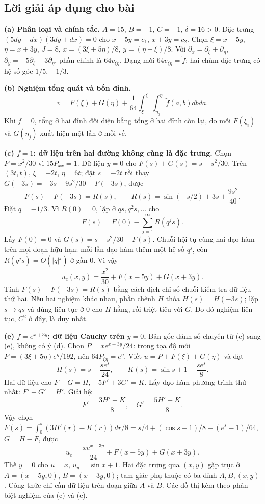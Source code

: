 \documentclass[10pt,a4paper]{article}
\begin{document}
\subsection*{Lời giải áp dụng cho bài}
\textbf{(a) Phân loại và chính tắc.} $A=15$, $B=-1$, $C=-1$, $\delta=16>0$. Đặc trưng $(5dy-dx)(3dy+dx)=0$ cho $x-5y=c_1$, $x+3y=c_2$. Chọn $\xi=x-5y$, $\eta=x+3y$, $J=8$, $x=(3\xi+5\eta)/8$, $y=(\eta-\xi)/8$. Với $\partial_x=\partial_\xi+\partial_\eta$, $\partial_y=-5\partial_\xi+3\partial_\eta$, phần chính là $64v_{\xi\eta}$. Dạng mới $64v_{\xi\eta}=\widetilde f$; hai chùm đặc trưng có hệ số góc $1/5$, $-1/3$.

\textbf{(b) Nghiệm tổng quát và bốn đỉnh.}
\[v=F(\xi)+G(\eta)+\frac1{64}\int_{\xi_0}^{\xi}\int_{\eta_0}^{\eta}\widetilde f(a,b)dbda.\]
Khi $f=0$, tổng ở hai đỉnh đối diện bằng tổng ở hai đỉnh còn lại, do mỗi $F(\xi_i)$ và $G(\eta_j)$ xuất hiện một lần ở mỗi vế.

\textbf{(c) $f=1$: dữ liệu trên hai đường không cùng là đặc trưng.} Chọn $P=x^2/30$ vì $15P_{xx}=1$. Dữ liệu $y=0$ cho $F(s)+G(s)=s-s^2/30$. Trên $(3t,t)$, $\xi=-2t$, $\eta=6t$; đặt $s=-2t$ rồi thay $G(-3s)=-3s-9s^2/30-F(-3s)$, được
\[F(s)-F(-3s)=R(s),\qquad R(s)=\sin(-s/2)+3s+\frac{9s^2}{40}.\]
Đặt $q=-1/3$. Vì $R(0)=0$, lặp ở $qs,q^2s,\ldots$ cho
\[F(s)=F(0)-\sum_{j=1}^{\infty}R(q^js).\]
Lấy $F(0)=0$ và $G(s)=s-s^2/30-F(s)$. Chuỗi hội tụ cùng hai đạo hàm trên mọi đoạn hữu hạn: mỗi lần đạo hàm thêm một hệ số $q^j$, còn $R(q^js)=O(|q|^j)$ ở gần $0$. Vì vậy
\[\boxed{u_c(x,y)=\frac{x^2}{30}+F(x-5y)+G(x+3y).}\]
Tính $F(s)-F(-3s)=R(s)$ bằng cách dịch chỉ số chuỗi kiểm tra dữ liệu thứ hai. Nếu hai nghiệm khác nhau, phần chênh $H$ thỏa $H(s)=H(-3s)$; lặp $s\mapsto qs$ và dùng liên tục ở $0$ cho $H$ hằng, rồi triệt tiêu với $G$. Do đó nghiệm liên tục, $C^2$ ở đây, là duy nhất.

\textbf{(e) $f=e^{x+3y}$: dữ liệu Cauchy trên $y=0$.} Bản gốc đánh số chuyển từ (c) sang (e), không có ý (d). Chọn $P=xe^{x+3y}/24$: trong tọa độ mới $P=(3\xi+5\eta)e^\eta/192$, nên $64P_{\xi\eta}=e^\eta$. Viết $u=P+F(\xi)+G(\eta)$ và đặt
\[H(s)=s-\frac{se^s}{24},\qquad K(s)=\sin s+1-\frac{se^s}{8}.\]
Hai dữ liệu cho $F+G=H$, $-5F'+3G'=K$. Lấy đạo hàm phương trình thứ nhất: $F'+G'=H'$. Giải hệ:
\[F'=\frac{3H'-K}{8},\quad G'=\frac{5H'+K}{8}.\]
Vậy chọn $F(s)=\int_0^s(3H'(r)-K(r))dr/8=s/4+(\cos s-1)/8-(e^s-1)/64$, $G=H-F$, được
\[\boxed{u_e=\frac{xe^{x+3y}}{24}+F(x-5y)+G(x+3y).}\]
Thế $y=0$ cho $u=x$, $u_y=\sin x+1$. Hai đặc trưng qua $(x,y)$ gặp trục ở $A=(x-5y,0)$, $B=(x+3y,0)$; tam giác phụ thuộc có ba đỉnh $A,B,(x,y)$. Công thức chỉ cần dữ liệu trên đoạn giữa $A$ và $B$. Các đồ thị kèm theo phân biệt nghiệm của (c) và (e).
\end{document}

